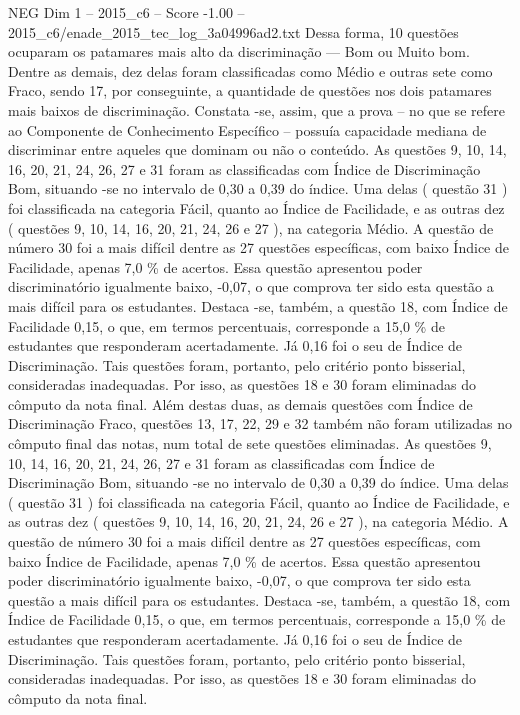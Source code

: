 \begin{textsample}{NEG Dim 1 – 2015\_c6 – Score -1.00 – 2015\_c6/enade\_2015\_tec\_log\_3a04996ad2.txt}
Dessa forma, 10 questões ocuparam os patamares mais alto da discriminação — Bom ou Muito bom.
Dentre as demais, dez delas foram classificadas como Médio e outras sete como Fraco, sendo 17, por conseguinte, a quantidade de questões nos dois patamares mais baixos de discriminação.
Constata -se, assim, que a prova – no que se refere ao Componente de Conhecimento Específico – possuía capacidade mediana de discriminar entre aqueles que dominam ou não o conteúdo.
As questões 9, 10, 14, 16, 20, 21, 24, 26, 27 e 31 foram as classificadas com Índice de Discriminação Bom, situando -se no intervalo de 0,30 a 0,39 do índice.
Uma delas ( questão 31 ) foi classificada na categoria Fácil, quanto ao Índice de Facilidade, e as outras dez ( questões 9, 10, 14, 16, 20, 21, 24, 26 e 27 ), na categoria Médio.
A questão de número 30 foi a mais difícil dentre as 27 questões específicas, com baixo Índice de Facilidade, apenas 7,0 \% de acertos.
Essa questão apresentou poder discriminatório igualmente baixo, -0,07, o que comprova ter sido esta questão a mais difícil para os estudantes.
Destaca -se, também, a questão 18, com Índice de Facilidade 0,15, o que, em termos percentuais, corresponde a 15,0 \% de estudantes que responderam acertadamente.
Já 0,16 foi o seu de Índice de Discriminação.
Tais questões foram, portanto, pelo critério ponto bisserial, consideradas inadequadas.
Por isso, as questões 18 e 30 foram eliminadas do cômputo da nota final.
Além destas duas, as demais questões com Índice de Discriminação Fraco, questões 13, 17, 22, 29 e 32 também não foram utilizadas no cômputo final das notas, num total de sete questões eliminadas.
As questões 9, 10, 14, 16, 20, 21, 24, 26, 27 e 31 foram as classificadas com Índice de Discriminação Bom, situando -se no intervalo de 0,30 a 0,39 do índice.
Uma delas ( questão 31 ) foi classificada na categoria Fácil, quanto ao Índice de Facilidade, e as outras dez ( questões 9, 10, 14, 16, 20, 21, 24, 26 e 27 ), na categoria Médio.
A questão de número 30 foi a mais difícil dentre as 27 questões específicas, com baixo Índice de Facilidade, apenas 7,0 \% de acertos.
Essa questão apresentou poder discriminatório igualmente baixo, -0,07, o que comprova ter sido esta questão a mais difícil para os estudantes.
Destaca -se, também, a questão 18, com Índice de Facilidade 0,15, o que, em termos percentuais, corresponde a 15,0 \% de estudantes que responderam acertadamente.
Já 0,16 foi o seu de Índice de Discriminação.
Tais questões foram, portanto, pelo critério ponto bisserial, consideradas inadequadas.
Por isso, as questões 18 e 30 foram eliminadas do cômputo da nota final.

\end{textsample}
